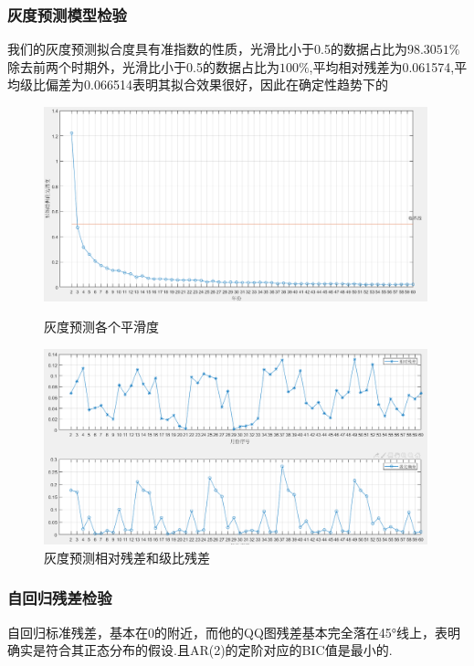 \documentclass{whutmod}
\begin{document}
	\subsubsection{灰度预测模型检验}
	我们的灰度预测拟合度具有准指数的性质，光滑比小于0.5的数据占比为$98.3051\%$除去前两个时期外，光滑比小于0.5的数据占比为$100\%$,平均相对残差为0.061574,平均级比偏差为0.066514表明其拟合效果很好，因此在确定性趋势下的
	\begin{figure}[!htbp]
		\begin{minipage}[t]{0.5\textwidth}
		\centering
		\includegraphics[width=0.99\textwidth]{pinhua.png}
		\caption{灰度预测各个平滑度}
		\end{minipage}
		\qquad
		\begin{minipage}[t]{0.5\textwidth}
		\centering
		\includegraphics[width=0.99\textwidth]{huidumse.png}
		\caption{灰度预测相对残差和级比残差}
		\end{minipage}
	\end{figure}
	\subsubsection{自回归残差检验}
	自回归标准残差，基本在0的附近，而他的QQ图残差基本完全落在45°线上，表明确实是符合其正态分布的假设.且AR(2)的定阶对应的BIC值是最小的.
	
\end{document}

